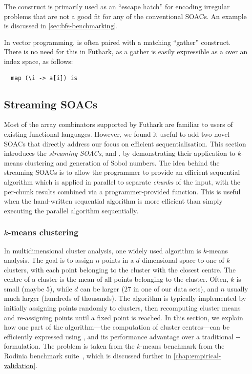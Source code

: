 The  construct is primarily used as an ``escape hatch''
for encoding irregular problems that are not a good fit for any of the
conventional SOACs.  An example is discussed in
\cref{sec:bfs-benchmarking}.

In vector programming,  is often paired with a matching
``gather'' construct.  There is no need for this in Futhark, as a
gather is easily expressible as a  over an index space, as
follows:

\begin{lstlisting}
  map (\i -> a[i]) is
\end{lstlisting}

\subsection{Streaming SOACs}
\label{sec:streaming-soacs}

Most of the array combinators supported by Futhark are familiar to
users of existing functional languages.  However, we found it useful
to add two novel SOACs that directly address our focus on efficient
sequentialisation.  This section introduces the \textit{streaming
  SOACs}, \StreamRed{} and \StreamMap{}, by demonstrating their
application to $k$-means clustering and generation of Sobol numbers.
The idea behind the streaming SOACs is to allow the programmer to
provide an efficient sequential algorithm which is applied in parallel
to separate \textit{chunks} of the input, with the per-chunk results
combined via a programmer-provided function.  This is useful when the
hand-written sequential algorithm is more efficient than simply
executing the parallel algorithm sequentially.

\subsubsection{$k$-means clustering}

In multidimensional cluster analysis, one widely used algorithm is
$k$-means analysis.  The goal is to assign $n$ points in a
$d$-dimensional space to one of $k$ clusters, with each point
belonging to the cluster with the closest centre.  The centre of a
cluster is the mean of all points belonging to the cluster.  Often,
$k$ is small (maybe $5$), while $d$ can be larger ($27$ in one of our
data sets), and $n$ usually much larger (hundreds of thousands).  The
algorithm is typically implemented by initially assigning points
randomly to clusters, then recomputing cluster means and re-assigning
points until a fixed point is reached.  In this section, we explain
how one part of the algorithm---the computation of cluster
centres---can be efficiently expressed using \StreamRed{}, and its
performance advantage over a traditional
--formulation.  The problem is taken from the
$k$-means benchmark from the Rodinia benchmark suite~\cite{5306797},
which is discussed further in \cref{chap:empirical-validation}.

